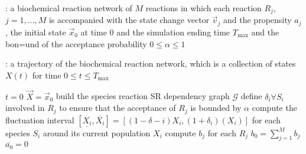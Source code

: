 \begin{algorithm}[H]
\DontPrintSemicolon
{}

\caption{\protect\TitleFunction{}}
\label{algo:ba-rssa}

\Input: a biochemical reaction network of $M$ reactions in which each reaction $R_j$, $j=1, \dots, M$ is accompanied with the state change vector $\vec{v}_j$ and the propensity $a_j$, the initial state $\vec{x}_0$ at time $0$ and the simulation ending time $T_{\max}$ and the bon=und of the acceptance probability $0\le\alpha\le 1$\;

\Output: a trajectory of the biochemical reaction network, which is a collection of states $X(t)$ for time $0\le t\le T_{\max}$\;

$t = 0$\;
$\vec{X} = \vec{x}_0$\;
build the species reaction SR dependency graph $\mathcal{G}$\;
define $\delta_i\forall S_i$ involved in $R_j$ to ensure that the acceptance of $R_j$ is bounded by $\alpha$\;
compute the fluctuation interval $[\underline{X_i}, \overline{X_i}] = [(1-\delta-i)X_i, (1+\delta_i)(X_i)]$ for each species $S_i$ around its current population $X_i$\;
compute $b_j$ for each $R_j$\;
$b_0 = \sum\limits_{j=1}^Mb_j$\;
$\overline{a_0} = 0$\;


\end{algorithm}
